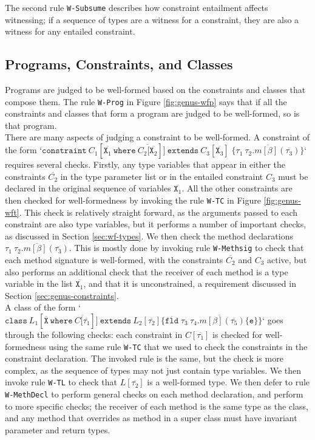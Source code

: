 The second rule \texttt{W-Subsume} describes how constraint entailment affects witnessing; if a sequence of types are a witness for a constraint, they are also a witness for any entailed constraint.

\subsection{Programs, Constraints, and Classes}

Programs are judged to be well-formed based on the constraints and classes that compose them. The rule \texttt{W-Prog} in Figure \ref{fig:genus-wfp} says that if all the constraints and classes that form a program are judged to be well-formed, so is that program. \\

There are many aspects of judging a constraint to be well-formed. A constraint of the form `$\texttt{constraint} \: C_1[\overline{\texttt{X}_1} \: \texttt{where} \: \overline{C_2[\overline{\texttt{X}_2}}]] \: \texttt{extends} \: C_3[\overline{\texttt{X}_3}] \; \{ \overline{\tau_1 \: \tau_2.m[\beta](\overline{\tau_3})} \}$` requires several checks. Firstly, any type variables that appear in either the constraints $\overline{C_2}$ in the type parameter list or in the entailed constraint $C_3$ must be declared in the original sequence of variables $\overline{\texttt{X}_1}$. All the other constraints are then checked for well-formedness by invoking the rule \texttt{W-TC} in Figure \ref{fig:genus-wft}. This check is relatively straight forward, as the arguments passed to each constraint are also type variables, but it performs a number of important checks, as discussed in Section \ref{sec:wf-types}. We then check the method declarations $\overline{\tau_1 \: \tau_2.m[\beta](\overline{\tau_3})}$. This is mostly done by invoking rule \texttt{W-Methsig} to check that each method signature is well-formed, with the constraints $\overline{C_2}$ and $C_3$ active, but also performs an additional check that the receiver of each method is a type variable in the list $\overline{\texttt{X}_1}$, and that it is unconstrained, a requirement discussed in Section \ref{sec:genus-constraints}. \\

A class of the form `$\texttt{class} \: L_1[\overline{\texttt{X}} \: \texttt{where} \: \overline{C[\overline{\tau_1}}]] \: \texttt{extends} \:  L_2[\overline{\tau_2}] \{\overline{\texttt{fld}} \; \overline{\tau_3 \: \tau_4.m[\beta](\overline{\tau_5})\{\texttt{e}\}} \}$` goes through the following checks: each constraint in $C[\overline{\tau_1}]$ is checked for well-formedness using the same rule \texttt{W-TC} that we used to check the constraints in the constraint declaration. The invoked rule is the same, but the check is more complex, as the sequence of types may not just contain type variables. We then invoke rule \texttt{W-TL} to check that $L[\overline{\tau_2}]$ is a well-formed type. We then defer to rule \texttt{W-MethDecl} to perform general checks on each method declaration, and perform to more specific checks; the receiver of each method is the same type as the class, and any method that overrides as method in a super class must have invariant parameter and return types.

